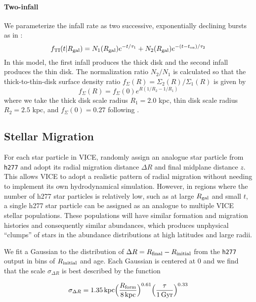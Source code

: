 \documentclass[twocolumn,linenumbers,twocolappendix]{aastex631}
\begin{document}
\paragraph{Two-infall} 
We parameterize the infall rate as two successive, exponentially declining bursts as in \citet{Chiappini2001-AbundanceGradients}:
\begin{equation}
    \label{eq:twoinfall-ifr}
    f_{\rm TI}(t|R_{\rm gal}) = N_1(R_{\rm gal}) e^{-t/\tau_1} + N_2(R_{\rm gal}) e^{-(t-t_{\rm on})/\tau_2}
\end{equation}
In this model, the first infall produces the thick disk and the second infall produces the thin disk. The normalization ratio $N_2/N_1$ is calculated so that the thick-to-thin-disk surface density ratio $f_\Sigma(R)=\Sigma_2(R)/\Sigma_1(R)$ is given by
\begin{equation}
    f_\Sigma(R) = f_\Sigma(0) e^{R(1/R_2 - 1/R_1)}
\end{equation}
where we take the thick disk scale radius $R_1=2.0$ kpc, thin disk scale radius $R_2=2.5$ kpc, and $f_\Sigma(0)=0.27$ following \citet{BlandHawthornGerhard2016-MilkyWayReview}.

\subsection{Stellar Migration}
\label{sec:migration}

For each star particle in VICE, \citet{Johnson2021-Migration} randomly assign an analogue star particle from \texttt{h277} and adopt its radial migration distance $\Delta R$ and final midplane distance $z$. This allows VICE to adopt a realistic pattern of radial migration without needing to implement its own hydrodynamical simulation. However, in regions where the number of h277 star particles is relatively low, such as at large $R_{\rm gal}$ and small $t$, a single h277 star particle can be assigned as an analogue to multiple VICE stellar populations. These populations will have similar formation and migration histories and consequently similar abundances, which produces unphysical ``clumps'' of stars in the abundance distributions at high latitudes and large radii. 

We fit a Gaussian to the distribution of $\Delta R = R_{\rm final} - R_{\rm initial}$ from the \texttt{h277} output in bins of $R_{\rm initial}$ and age. Each Gaussian is centered at 0 and we find that the scale $\sigma_{\Delta R}$ is best described by the function

\begin{equation}
    \sigma_{\Delta R} = 1.35\,{\rm kpc} \Big(\frac{R_{\rm form}}{8\,{\rm kpc}}\Big)^{0.61} \Big(\frac{\tau}{1\,{\rm Gyr}}\Big)^{0.33}
    \label{eq:radial-migration}
\end{equation}
\end{document}
